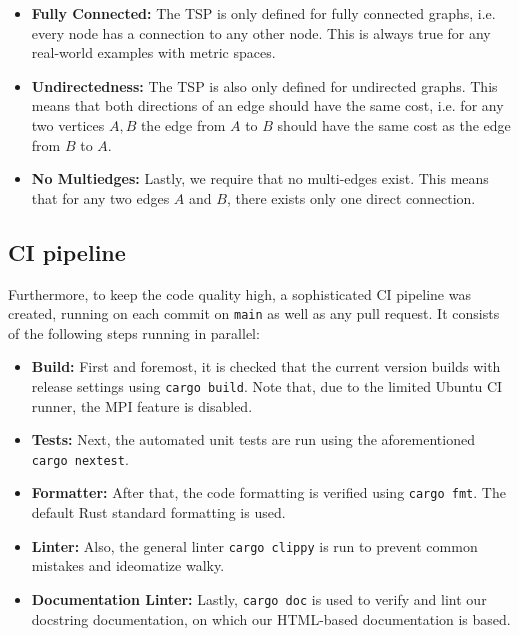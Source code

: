 \begin{itemize}
\item \textbf{Fully Connected:} The \ac{TSP} is only defined for fully connected graphs, i.e. every node has a connection to any other node. This is always true for any real-world examples with metric spaces.
\item \textbf{Undirectedness:} The \ac{TSP} is also only defined for undirected graphs. This means that both directions of an edge should have the same cost, i.e. for any two vertices $A, B$ the edge from $A$ to $B$ should have the same cost as the edge from $B$ to $A$.
\item \textbf{No Multiedges:} Lastly, we require that no multi-edges exist. This means that for any two edges $A$ and $B$, there exists only one direct connection.
\end{itemize}

\subsection{\ac{CI} pipeline}
Furthermore, to keep the code quality high, a sophisticated \ac{CI} pipeline was created, running on each commit on \texttt{main} as well as any pull request. It consists of the following steps running in parallel:
\begin{itemize}
\item \textbf{Build:} First and foremost, it is checked that the current version builds with release settings using \texttt{cargo build}. Note that, due to the limited Ubuntu \ac{CI} runner, the \ac{MPI} feature is disabled.
\item \textbf{Tests:} Next, the automated unit tests are run using the aforementioned \texttt{cargo nextest}.
\item \textbf{Formatter:} After that, the code formatting is verified using \texttt{cargo fmt}. The default Rust standard formatting is used.
\item \textbf{Linter:} Also, the general linter \texttt{cargo clippy} is run to prevent common mistakes and ideomatize walky.
\item \textbf{Documentation Linter:} Lastly, \texttt{cargo doc} is used to verify and lint our docstring documentation, on which our HTML-based documentation is based.
\end{itemize}

